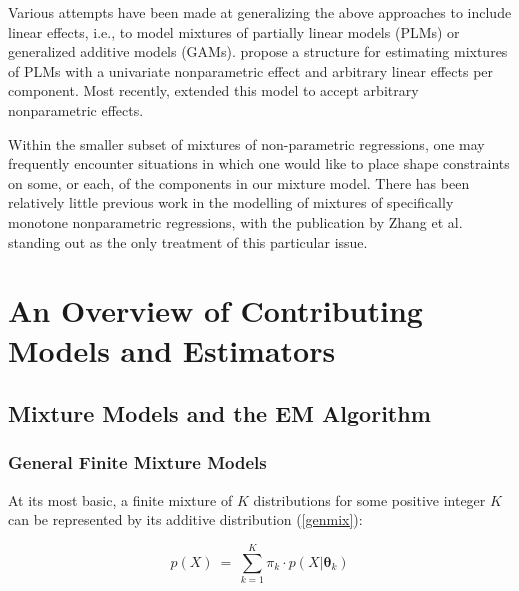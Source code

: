 \documentclass[10pt]{olplainarticle}\usepackage[]{graphicx}\usepackage[]{color}
\begin{document}
Various attempts have been made at generalizing the above approaches to include linear effects, i.e., to model mixtures of partially linear models (PLMs) or generalized additive models (GAMs). \cite{wu} propose a structure for estimating mixtures of PLMs with a univariate nonparametric effect and arbitrary linear effects per component. Most recently, \cite{zhangpan} extended this model to accept arbitrary nonparametric effects.




Within the smaller subset of mixtures of non-parametric regressions, one may frequently encounter situations in which one would like to place shape constraints on some, or each, of the components in our mixture model. There has been relatively little previous work in the modelling of mixtures of specifically monotone nonparametric regressions, with the publication by Zhang et al. standing out as the only treatment of this particular issue. 


\section{An Overview of Contributing Models and Estimators}

\subsection{Mixture Models and the EM Algorithm}

\subsubsection{General Finite Mixture Models}

At its most basic, a finite mixture of $K$ distributions for some positive integer $K$ can be represented by its additive distribution (\ref{genmix}):

\begin{equation} \label{genmix}
  p(X) \ =\ \sum_{k=1}^{K} \pi_k \cdot p(X | \boldsymbol{\theta}_k)
\end{equation}
\end{document}
